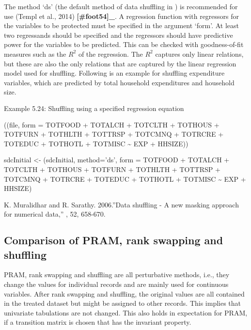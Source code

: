 \documentclass[letterpaper,10pt,english]{sphinxmanual}
\begin{document}
The method ‘ds’ (the default method of data shuffling in ) is
recommended for use (Templ et al., 2014) {\color{red}\bfseries{}{[}\#foot54{]}\_}. A
regression function with regressors for the variables to be protected
must be specified in the argument ‘form’. At least two regressands
should be specified and the regressors should have predictive power for
the variables to be predicted. This can be checked with goodness-of-fit
measures such as the \(R^{2}\) of the regression. The \(R^{2}\)
captures only linear relations, but these are also the only relations
that are captured by the linear regression model used for shuffling.
Following is an example for shuffling expenditure variables, which are
predicted by total household expenditures and household size.

Example 5.24: Shuffling using a specified regression equation

\begin{DUlineblock}{0em}
\item[] 
\item[] ((file, form = TOTFOOD + TOTALCH + TOTCLTH +
TOTHOUS + TOTFURN + TOTHLTH + TOTTRSP + TOTCMNQ + TOTRCRE + TOTEDUC +
TOTHOTL + TOTMISC \textasciitilde{} EXP + HHSIZE))
\end{DUlineblock}

\begin{DUlineblock}{0em}
\item[] 
\item[] sdcInitial \textless{}- (sdcInitial, method=’ds’, form = TOTFOOD +
TOTALCH + TOTCLTH + TOTHOUS + TOTFURN + TOTHLTH + TOTTRSP + TOTCMNQ +
TOTRCRE + TOTEDUC + TOTHOTL + TOTMISC \textasciitilde{} EXP + HHSIZE)
\end{DUlineblock}


K. Muralidhar and R. Sarathy. 2006.”Data shuffling - A new masking
approach for numerical data,” , 52, 658-670.


\subsection{Comparison of PRAM, rank swapping and shuffling}
\label{\detokenize{anon_methods:comparison-of-pram-rank-swapping-and-shuffling}}
PRAM, rank swapping and shuffling are all perturbative methods, i.e.,
they change the values for individual records and are mainly used for
continuous variables. After rank swapping and shuffling, the original
values are all contained in the treated dataset but might be assigned to
other records. This implies that univariate tabulations are not changed.
This also holds in expectation for PRAM, if a transition matrix is
chosen that has the invariant property.
\end{document}

